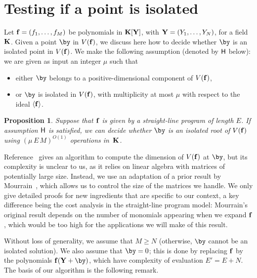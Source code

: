 \documentclass[12pt]{article}
\newtheorem{proposition}[definition]{Proposition}
\begin{document}
\section{Testing if a point is isolated} \label{sec:isolated}

Let $\mathbf{f}=(f_1,\dots,f_M)$ be polynomials in $\mathbf{K}[\mathbf{Y}]$, with
$\mathbf{Y}=(Y_1,\dots,Y_N)$, for a field $\mathbf{K}$. Given a point $\by$ in
$V(\mathbf{f})$, we discuss here how to decide whether $\by$ is an isolated
point in $V(\mathbf{f})$. We make the following assumption (denoted by $\mathsf{H}$
below): we are given as input an integer $\mu$ such that
\begin{itemize}
\item either $\by$ belongs to a positive-dimensional component of $V(\mathbf{f})$,
\item or $\by$ is isolated in $V(\mathbf{f})$, with multiplicity at most $\mu$
  with respect to the ideal $\langle \mathbf{f}\rangle$.
\end{itemize}

\begin{proposition}\label{prop:testisolated}
  Suppose that $\mathbf{f}$ is given by a straight-line program of length $E$.
  If assumption $\mathsf{H}$ is satisfied, we can decide whether $\by$ is an
  isolated root of $V(\mathbf{f})$ using $(\mu\,E\,M)^{O(1)}$ operations in~$\mathbf{K}$.
\end{proposition}
Reference~\cite{BaHaPeSo09} gives an algorithm to compute the
dimension of $V(\mathbf{f})$ at $\by$, but its complexity is unclear to us, as
it relies on linear algebra with matrices of potentially large size.
Instead, we use an adaptation of a prior result by
Mourrain~\cite{Mourrain97}, which allows us to control the size of the
matrices we handle. We only give detailed proofs for new ingredients
that are specific to our context, a key difference being the cost
analysis in the straight-line program model: Mourrain's original
result depends on the number of monomials appearing when we expand
$\mathbf{f}$, which would be too high for the applications we will make of
this result.

Without loss of generality, we assume that $M\ge N$ (otherwise, $\by$
cannot be an isolated solution). We also assume that $\by=0$; this is
done by replacing $\mathbf{f}$ by the polynomials $\f(\Y+\by)$, which have
complexity of evaluation $E'=E+N$.  The basis of our algorithm is the
following remark.
\end{document}

